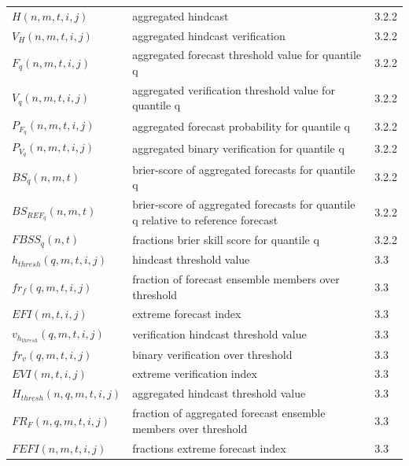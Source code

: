 \documentclass[preprint,12pt,authoryear]{elsarticle}
\begin{document}
\begin{table}[t]
\begin{center}
{\begin{tabular}{lll}
 $H(n,m,t,i,j)$ & aggregated hindcast & 3.2.2 \\
 $V_{H}(n,m,t,i,j)$ & aggregated hindcast verification & 3.2.2 \\
 $F_{q}(n,m,t,i,j)$ & aggregated forecast threshold value for quantile q & 3.2.2 \\ 
 $V_{q}(n,m,t,i,j)$ & aggregated verification threshold value for quantile q & 3.2.2 \\
 $P_{F_{q}}(n,m,t,i,j)$ & aggregated forecast probability for quantile q & 3.2.2 \\ 
 $P_{V_{q}}(n,m,t,i,j)$ & aggregated binary verification for quantile q & 3.2.2 \\ 
 $BS_{q}(n,m,t)$ & brier-score of aggregated forecasts for quantile q & 3.2.2 \\
 $BS_{REF_{q}}(n,m,t)$ & brier-score of aggregated forecasts for quantile q relative to reference forecast & 3.2.2 \\
 $FBSS_{q}(n,t)$ & fractions brier skill score for quantile q & 3.2.2 \\
 $h_{thresh}(q,m,t,i,j)$ & hindcast threshold value & 3.3 \\
 $fr_{f}(q,m,t,i,j)$ & fraction of forecast ensemble members over threshold & 3.3 \\
 $EFI(m,t,i,j)$ & extreme forecast index & 3.3 \\
 $v_{h_{thresh}}(q,m,t,i,j)$ & verification hindcast threshold value & 3.3 \\
 $fr_{v}(q,m,t,i,j)$ & binary verification over threshold & 3.3 \\
 $EVI(m,t,i,j)$ & extreme verification index & 3.3 \\
 $H_{thresh}(n,q,m,t,i,j)$ & aggregated hindcast threshold value & 3.3 \\
 $FR_{F}(n,q,m,t,i,j)$ & fraction of aggregated forecast ensemble members over threshold & 3.3 \\
 $FEFI(n,m,t,i,j)$ & fractions extreme forecast index & 3.3 \\
 
\hline
\end{tabular}
}
\end{center}
\end{table}


\end{document}
